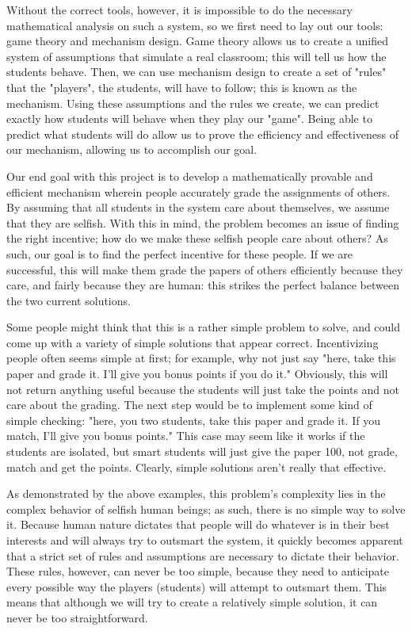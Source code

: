 \documentclass[12pt, Helvetica]{article}
\begin{document}
Without the correct tools, however, it is impossible to do the necessary mathematical analysis on such a system, so we first need to lay out our tools: game theory and mechanism design. Game theory allows us to create a unified system of assumptions that simulate a real classroom; this will tell us how the students behave. Then, we can use mechanism design to create a set of "rules" that the "players", the students, will have to follow; this is known as the mechanism. Using these assumptions and the rules we create, we can predict exactly how students will behave when they play our "game". Being able to predict what students will do allow us to prove the efficiency and effectiveness of our mechanism, allowing us to accomplish our goal.

Our end goal with this project is to develop a mathematically provable and efficient mechanism wherein people accurately grade the assignments of others. By assuming that all students in the system care about themselves, we assume that they are selfish. With this in mind, the problem becomes an issue of finding the right incentive; how do we make these selfish people care about others? As such, our goal is to find the perfect incentive for these people. If we are successful, this will make them grade the papers of others efficiently because they care, and fairly because they are human: this strikes the perfect balance between the two current solutions.

Some people might think that this is a rather simple problem to solve, and could come up with a variety of simple solutions that appear correct. Incentivizing people often seems simple at first; for example, why not just say "here, take this paper and grade it. I'll give you bonus points if you do it." Obviously, this will not return anything useful because the students will just take the points and not care about the grading. The next step would be to implement some kind of simple checking: "here, you two students, take this paper and grade it. If you match, I'll give you bonus points." This case may seem like it works if the students are isolated, but smart students will just give the paper 100, not grade, match and get the points. Clearly, simple solutions aren't really that effective.

As demonstrated by the above examples, this problem's complexity lies in the complex behavior of selfish human beings; as such, there is no simple way to solve it. Because human nature dictates that people will do whatever is in their best interests and will always try to outsmart the system, it quickly becomes apparent that a strict set of rules and assumptions are necessary to dictate their behavior. These rules, however, can never be too simple, because they need to anticipate every possible way the players (students) will attempt to outsmart them. This means that although we will try to create a relatively simple solution, it can never be too straightforward.
\end{document}
